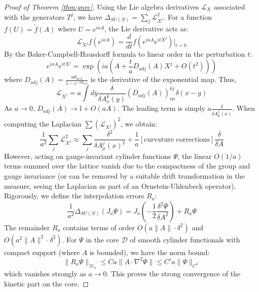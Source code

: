 \begin{proof}[Proof of Theorem \ref{thm:gnrc}]
Using the Lie algebra derivatives $\mathcal{L}_X$ associated with the generators $T^j$, we have $\Delta_{SU(N)} = \sum_j \mathcal{L}_{X^j}^2$.
For a function $f(U) = \tilde{f}(A)$ where $U = e^{iaA}$, the Lie derivative acts as:
\begin{equation}
\mathcal{L}_{X^j} f(e^{iaA}) = \frac{d}{dt} f(e^{iaA} e^{itX^j}) \Big|_{t=0}
\end{equation}
By the Baker-Campbell-Hausdorff formula to linear order in the perturbation $t$:
\begin{equation}
e^{iaA} e^{itX^j} = \exp\left( i a \left( A + \frac{t}{a} D_{adj}(A) X^j + O(t^2) \right) \right)
\end{equation}
where $D_{adj}(A) = \frac{ad_{iaA}}{1 - e^{-ad_{iaA}}}$ is the derivative of the exponential map.
Thus,
\begin{equation}
\mathcal{L}_{X^j} = a \int dy \frac{\delta}{\delta A_\nu^k(y)} \left( D_{adj}(A) \right)^{k j}_{\nu \mu} \delta(x-y)
\end{equation}
As $a \to 0$, $D_{adj}(A) \to \mathbb{I} + O(a A)$. The leading term is simply $a \frac{\delta}{\delta A_\mu^j(x)}$.
When computing the Laplacian $\sum (\mathcal{L}_{X^j})^2$, we obtain:
\begin{equation}
\frac{1}{a^2} \sum_j \mathcal{L}_{X^j}^2 \approx \sum_j \frac{\delta^2}{\delta A_\mu^j(x)^2} + \frac{1}{a} [\text{curvature corrections}] \frac{\delta}{\delta A}
\end{equation}
However, acting on gauge-invariant cylinder functions $\Psi$, the linear $O(1/a)$ terms summed over the lattice vanish due to the compactness of the group and gauge invariance (or can be removed by a suitable drift transformation in the measure, seeing the Laplacian as part of an Ornstein-Uhlenbeck operator).
Rigorously, we define the interpolation errors $R_a$:
\begin{equation}
\frac{1}{a^2} \Delta_{SU(N)} (J_a \Psi) = J_a \left( -\frac{1}{2} \frac{\delta^2 \Psi}{\delta A^2} \right) + R_a \Psi
\end{equation}
The remainder $R_a$ contains terms of order $O(a \|A\| \cdot \delta^2) $ and $O(a^2 \|A\|^2 \cdot \delta^2)$.
For $\Psi$ in the core $\mathcal{D}$ of smooth cylinder functionals with compact support (where $A$ is bounded), we have the norm bound:
\begin{equation}
\| R_a \Psi \|_{\mathcal{H}_a} \le C a \| A \cdot \nabla^2 \Psi \| \le C' a \| \Psi \|_{C^3}
\end{equation}
which vanishes strongly as $a \to 0$. This proves the strong convergence of the kinetic part on the core.


\end{proof}
